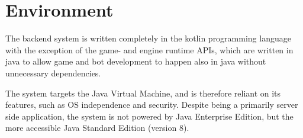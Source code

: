 




%

\chapter{Environment}\label{sect:Environment}

The backend system is written completely in the kotlin programming language with the exception of the game- and engine runtime APIs, which are written in java to allow game and bot development to happen also in java without unnecessary dependencies.

The system targets the Java Virtual Machine, and is therefore reliant on its features, such as OS independence and security. Despite being a primarily server side application, the system is not powered by Java Enterprise Edition, but the more accessible Java Standard Edition (version 8).

